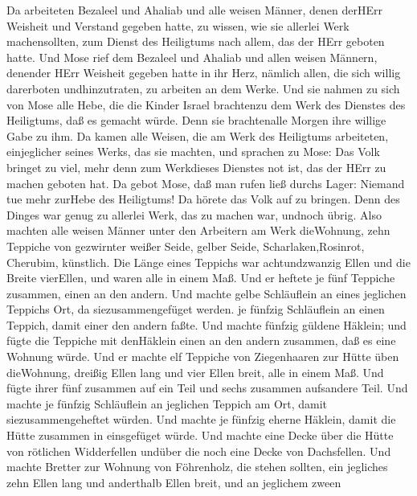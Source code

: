  Da arbeiteten Bezaleel und Ahaliab und alle weisen Männer,
denen derHErr Weisheit und Verstand gegeben hatte, zu wissen, wie sie
allerlei Werk machensollten, zum Dienst des Heiligtums nach allem, das
der HErr geboten hatte.  Und Mose rief dem Bezaleel und
Ahaliab und allen weisen Männern, denender HErr Weisheit gegeben hatte
in ihr Herz, nämlich allen, die sich willig darerboten undhinzutraten,
zu arbeiten an dem Werke.  Und sie nahmen zu sich von Mose
alle Hebe, die die Kinder Israel brachtenzu dem Werk des Dienstes des
Heiligtums, daß es gemacht würde. Denn sie brachtenalle Morgen ihre
willige Gabe zu ihm.  Da kamen alle Weisen, die am Werk des
Heiligtums arbeiteten, einjeglicher seines Werks, das sie machten,
 und sprachen zu Mose: Das Volk bringet zu viel, mehr denn
zum Werkdieses Dienstes not ist, das der HErr zu machen geboten hat.
 Da gebot Mose, daß man rufen ließ durchs Lager: Niemand tue
mehr zurHebe des Heiligtums! Da hörete das Volk auf zu bringen.
 Denn des Dinges war genug zu allerlei Werk, das zu machen
war, undnoch übrig.  Also machten alle weisen Männer unter
den Arbeitern am Werk dieWohnung, zehn Teppiche von gezwirnter weißer
Seide, gelber Seide, Scharlaken,Rosinrot, Cherubim, künstlich.
 Die Länge eines Teppichs war achtundzwanzig Ellen und die
Breite vierEllen, und waren alle in einem Maß.  Und er
heftete je fünf Teppiche zusammen, einen an den andern. 
Und machte gelbe Schläuflein an eines jeglichen Teppichs Ort, da
siezusammengefüget werden.  je fünfzig Schläuflein an einen
Teppich, damit einer den andern faßte.  Und machte fünfzig
güldene Häklein; und fügte die Teppiche mit denHäklein einen an den
andern zusammen, daß es eine Wohnung würde.  Und er machte
elf Teppiche von Ziegenhaaren zur Hütte üben dieWohnung, 
dreißig Ellen lang und vier Ellen breit, alle in einem Maß.
 Und fügte ihrer fünf zusammen auf ein Teil und sechs
zusammen aufsandere Teil.  Und machte je fünfzig
Schläuflein an jeglichen Teppich am Ort, damit siezusammengeheftet
würden.  Und machte je fünfzig eherne Häklein, damit die
Hütte zusammen in einsgefüget würde.  Und machte eine Decke
über die Hütte von rötlichen Widderfellen undüber die noch eine Decke
von Dachsfellen.  Und machte Bretter zur Wohnung von
Föhrenholz, die stehen sollten,  ein jegliches zehn Ellen
lang und anderthalb Ellen breit,  und an jeglichem zween
